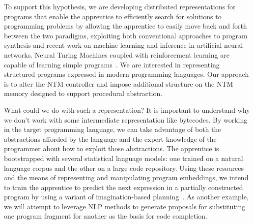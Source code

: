 \documentclass[letterpaper,11pt]{article}
\begin{document}

To support this hypothesis, we are developing distributed representations for programs that enable the apprentice to efficiently search for solutions to programming problems by allowing the apprentice to easily move back and forth between the two paradigms, exploiting both conventional approaches to program synthesis and recent work on machine learning and inference in artificial neural networks. Neural Turing Machines coupled with reinforcement learning are capable of learning simple programs~\cite{GravesetalCoRR-14}. We are interested in representing structured programs expressed in modern programming languages. Our approach is to alter the NTM controller and impose additional structure on the NTM memory designed to support procedural abstraction. 





What could we do with such a representation? It is important to understand why we don’t work with some intermediate representation like bytecodes. By working in the target programming language, we can take advantage of both the abstractions afforded by the language and the expert knowledge of the programmer about how to exploit those abstractions. The apprentice is bootstrapped with several statistical language models: one trained on a natural language corpus and the other on a large code repository. Using these resources and the means of representing and manipulating program embeddings, we intend to train the apprentice to predict the next expression in a partially constructed program by using a variant of imagination-based planning~\cite{PascanuetalCoRR-17}. As another example, we will attempt to leverage NLP methods to generate proposals for substituting one program fragment for another as the basis for code completion. 

\end{document}
